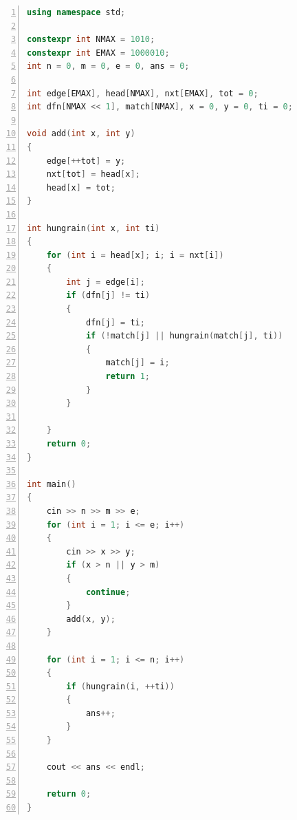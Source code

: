 \documentclass[a4paper,twoside]{article}
\begin{document}
\begin{spacing}{1.2}
\begin{lstlisting}[language=c++,numbers=left,style=CppStyle,caption=红包发放,label={code:redpacket}]
using namespace std;

constexpr int NMAX = 1010;
constexpr int EMAX = 1000010;
int n = 0, m = 0, e = 0, ans = 0;

int edge[EMAX], head[NMAX], nxt[EMAX], tot = 0;
int dfn[NMAX << 1], match[NMAX], x = 0, y = 0, ti = 0;

void add(int x, int y)
{
	edge[++tot] = y;
	nxt[tot] = head[x];
	head[x] = tot;
}

int hungrain(int x, int ti)
{
	for (int i = head[x]; i; i = nxt[i])
	{
		int j = edge[i];
		if (dfn[j] != ti)
		{
			dfn[j] = ti;
			if (!match[j] || hungrain(match[j], ti))
			{
				match[j] = i;
				return 1;
			}
		}

	}
	return 0;
}

int main()
{
	cin >> n >> m >> e;
	for (int i = 1; i <= e; i++)
	{
		cin >> x >> y;
		if (x > n || y > m)
		{
			continue;
		}
		add(x, y);
	}

	for (int i = 1; i <= n; i++)
	{
		if (hungrain(i, ++ti))
		{
			ans++;
		}
	}

	cout << ans << endl;

	return 0;
}
\end{lstlisting}

\end{spacing}
\end{document}
